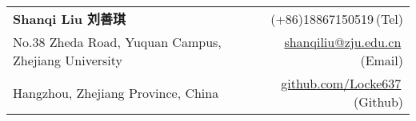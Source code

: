 \newcommand{\paint}[3]{
    \begin{minipage}{#1}
        \texttt{[image: \#3]}
    \end{minipage}
}
\newcommand{\myheader}{
    \begin{tabular*}{\textwidth}{l@{\extracolsep{\fill}}r}
        \specialrule{0em}{4pt}{4pt}
        \textbf{{\LARGE Shanqi Liu 刘善琪}} & (+86)18867150519$\,${\color{labelgrey}(Tel)}\\
        No.38 Zheda Road, Yuquan Campus, Zhejiang University$\,$ &\href{mailto:shanqiliu@zju.edu.cn}{shanqiliu@zju.edu.cn}$\,${\color{labelgrey}(Email)} \\
        Hangzhou, Zhejiang Province, China$\,$& \href{https://github.com/Locke637}{github.com/Locke637}$\,${\color{labelgrey}(Github)} \\
    \end{tabular*}\\

}

\myheader

